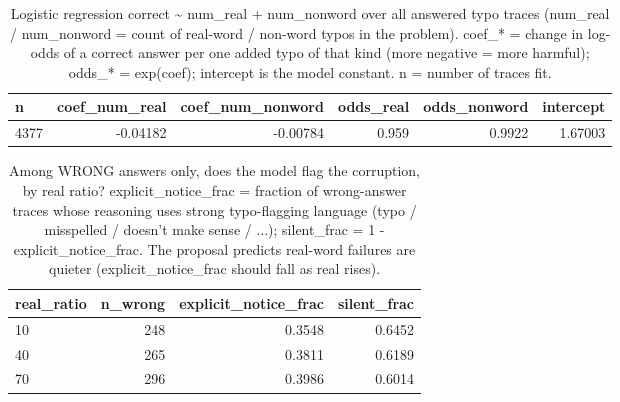 \documentclass[11pt]{article}
\begin{document}
\begin{table}[H]
\centering
\caption{Logistic regression correct \textasciitilde{} num\_real + num\_nonword over all answered typo traces (num\_real / num\_nonword = count of real-word / non-word typos in the problem). coef\_* = change in log-odds of a correct answer per one added typo of that kind (more negative = more harmful); odds\_* = exp(coef); intercept is the model constant. n = number of traces fit.}
\small
\begin{adjustbox}{max width=\textwidth}
\begin{tabular}{lrrrrr}
\toprule
\textbf{n} & \textbf{coef\_num\_real} & \textbf{coef\_num\_nonword} & \textbf{odds\_real} & \textbf{odds\_nonword} & \textbf{intercept} \\
\midrule
4377 & -0.04182 & -0.00784 & 0.959 & 0.9922 & 1.67003 \\
\bottomrule
\end{tabular}
\end{adjustbox}
\end{table}

\begin{table}[H]
\centering
\caption{Among WRONG answers only, does the model flag the corruption, by real ratio? explicit\_notice\_frac = fraction of wrong-answer traces whose reasoning uses strong typo-flagging language (typo / misspelled / doesn't make sense / ...); silent\_frac = 1 - explicit\_notice\_frac. The proposal predicts real-word failures are quieter (explicit\_notice\_frac should fall as real rises).}
\small
\begin{adjustbox}{max width=\textwidth}
\begin{tabular}{lrrr}
\toprule
\textbf{real\_ratio} & \textbf{n\_wrong} & \textbf{explicit\_notice\_frac} & \textbf{silent\_frac} \\
\midrule
10 & 248 & 0.3548 & 0.6452 \\
40 & 265 & 0.3811 & 0.6189 \\
70 & 296 & 0.3986 & 0.6014 \\
\bottomrule
\end{tabular}
\end{adjustbox}
\end{table}
\end{document}
